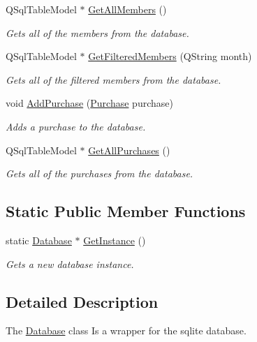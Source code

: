 \begin{DoxyCompactItemize}
Q\+Sql\+Table\+Model $\ast$ \hyperlink{class_database_a814cf5256dbd1660e3db8beb3a49ebf1}{Get\+All\+Members} ()
\begin{DoxyCompactList}\small\item\em Gets all of the members from the database. \end{DoxyCompactList}\item 
Q\+Sql\+Table\+Model $\ast$ \hyperlink{class_database_a68f574c4873b6687715bb0decc752ada}{Get\+Filtered\+Members} (Q\+String month)
\begin{DoxyCompactList}\small\item\em Gets all of the filtered members from the database. \end{DoxyCompactList}\item 
void \hyperlink{class_database_a908114ff4d6dc748ebdd2579ebd6c79c}{Add\+Purchase} (\hyperlink{class_purchase}{Purchase} purchase)
\begin{DoxyCompactList}\small\item\em Adds a purchase to the database. \end{DoxyCompactList}\item 
Q\+Sql\+Table\+Model $\ast$ \hyperlink{class_database_a9f87a20b8475c8f02845aaf5bf039cbe}{Get\+All\+Purchases} ()
\begin{DoxyCompactList}\small\item\em Gets all of the purchases from the database. \end{DoxyCompactList}\end{DoxyCompactItemize}
\subsection*{Static Public Member Functions}
\begin{DoxyCompactItemize}
\item 
static \hyperlink{class_database}{Database} $\ast$ \hyperlink{class_database_a263f3471515ca1bb7ea0a096f7502d49}{Get\+Instance} ()
\begin{DoxyCompactList}\small\item\em Gets a new database instance. \end{DoxyCompactList}\end{DoxyCompactItemize}


\subsection{Detailed Description}
The \hyperlink{class_database}{Database} class Is a wrapper for the sqlite database. 

